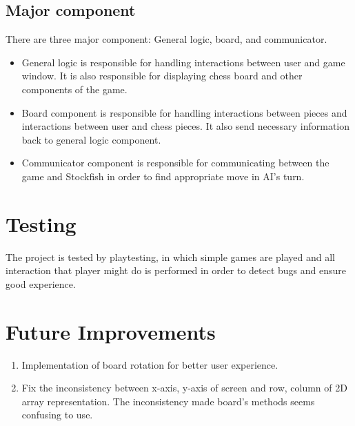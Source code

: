 \documentclass[a4paper, 10pt, titlepage]{report}
\begin{document}
\section{Major component}
There are three major component: General logic, board, and communicator.
\begin{itemize}
  \item General logic is responsible for handling interactions between user and game window. It is also responsible for displaying chess board and other components of the game.
  \item Board component is responsible for handling interactions between pieces and interactions between user and chess pieces. It also send necessary information back to general logic component.
  \item Communicator component is responsible for communicating between the game and Stockfish in order to find appropriate move in AI's turn.
\end{itemize}
\chapter{Testing}

The project is tested by playtesting, in which simple games are played and all interaction that player might do is performed in order to detect bugs and ensure good experience.
\chapter{Future Improvements}
\begin{enumerate}
  \item Implementation of board rotation for better user experience.
  \item Fix the inconsistency between x-axis, y-axis of screen and row, column of 2D array representation. The inconsistency made board's methods seems confusing to use.
\end{enumerate}
\end{document}
